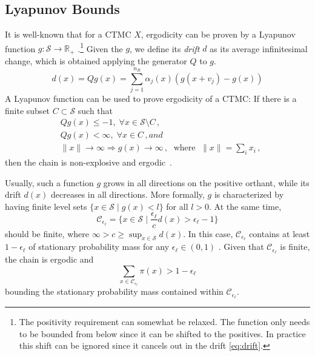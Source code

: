 \subsection{Lyapunov Bounds}\label{sec:statagg:lyapunov}
It is well-known that for a \ac{CTMC} $X$, ergodicity can be proven by a Lyapunov function $g:\mathcal{S}\to\mathbb{R}_+$ \cite{meyn1993stability,dayar2011bounding}.\footnote{The positivity requirement can somewhat be relaxed. The function only needs to be bounded from below since it can be shifted to the positives. In practice this shift can be ignored since it cancels out in the drift \eqref{eq:drift}.}
Given the $g$, we define its \emph{drift} $d$ as its average infinitesimal change, which is obtained applying the generator $Q$ to $g$. 
\begin{equation}\label{eq:drift}
	d(x) = Qg(x) = \sum_{j=1}^{n_R} \alpha_j(x) (g(x+v_j) -  g(x))
\end{equation}
A Lyapunov function can be used to prove ergodicity of a \ac{CTMC}: If there is a finite subset $C\subset\mathcal{S}$ such that
\begin{align}
	&Qg(x)\leq -1,\; \forall x\in\mathcal{S}\setminus C\,,\\
	&Qg(x)< \infty,\; \forall x\in C\,, and\\
	&\lVert x\rVert\to\infty \Rightarrow g(x)\to\infty\,,\;\text{ where }\;\lVert x\rVert=\sum_i x_i\,,
\end{align}
then the chain is non-explosive and ergodic~\cite{milias2014optimization,tweedie_1975}.


Usually, such a function $g$ grows in all directions on the positive orthant, while its drift $d(x)$ decreases in all directions.
More formally, $g$ is characterized by having finite level sets $\{x\in\mathcal{S} \mid g(x) < l\}$ for all $l > 0$.
At the same time,
\begin{equation}\label{eq:lyapunov_set}
    \mathcal{C}_{\epsilon_{\ell}} = \{ x\in\mathcal{S} \mid
    \frac{\epsilon_{\ell}}{c}d(x) > \epsilon_{\ell} - 1\}
\end{equation}
should be finite, where $\infty> c\geq \sup_{x\in\mathcal{S}} d(x)$.
In this case, $\mathcal{C}_{\epsilon_{\ell}}$ contains at least $1-\epsilon_{\ell}$ of stationary probability mass for any $\epsilon_{\ell}\in(0,1)$ \cite[Thm.~8]{spieler2014numerical}.
Given that $\mathcal{C}_{\epsilon_{\ell}}$ is finite, the chain is ergodic and
\begin{equation}
    \sum_{x\in\mathcal{C}_{\epsilon_{\ell}}}\pi(x)> 1 - \epsilon_{\ell}
\end{equation}
bounding the stationary probability mass contained within $\mathcal{C}_{\epsilon_{\ell}}$.



